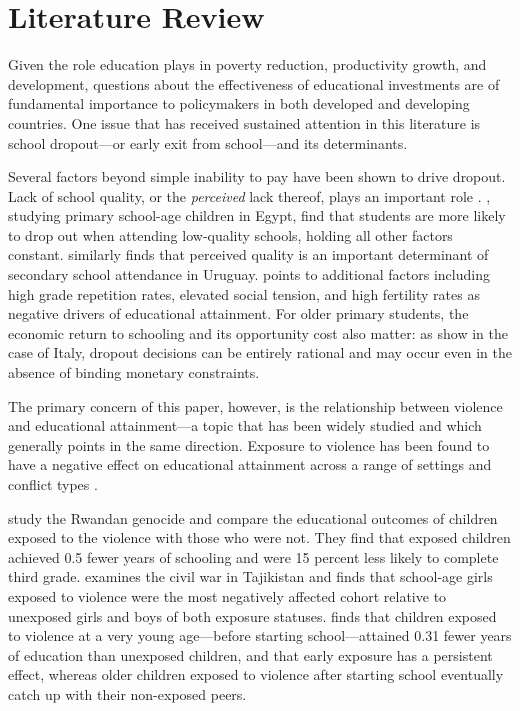 
\section{Literature Review}
\label{sec:literature}

Given the role education plays in poverty reduction, productivity growth,
and development, questions about the effectiveness of educational investments
are of fundamental importance to policymakers in both developed and
developing countries. One issue that has received sustained attention in this
literature is school dropout---or early exit from school---and its
determinants.

Several factors beyond simple inability to pay have been shown to drive
dropout. Lack of school quality, or the \emph{perceived} lack thereof,
plays an important role \citep{levy1971, hanushek2008, patron2008}.
\citet{hanushek2008}, studying primary school-age children in Egypt, find
that students are more likely to drop out when attending low-quality schools,
holding all other factors constant. \citet{patron2008} similarly finds that
perceived quality is an important determinant of secondary school attendance
in Uruguay. \citet{levy1971} points to additional factors including high
grade repetition rates, elevated social tension, and high fertility rates
as negative drivers of educational attainment. For older primary students,
the economic return to schooling and its opportunity cost also matter: as
\citet{ohiggins2008} show in the case of Italy, dropout decisions can be
entirely rational and may occur even in the absence of binding monetary
constraints.

The primary concern of this paper, however, is the relationship between
violence and educational attainment---a topic that has been widely studied
and which generally points in the same direction. Exposure to violence has
been found to have a negative effect on educational attainment across a
range of settings and conflict types \citep{akresh2008, swee2009,
rodriguez2009, shemyakina2011, leon2012}.

\citet{akresh2008} study the Rwandan genocide and compare the educational
outcomes of children exposed to the violence with those who were not.
They find that exposed children achieved 0.5 fewer years of schooling and
were 15 percent less likely to complete third grade. \citet{shemyakina2011}
examines the civil war in Tajikistan and finds that school-age girls
exposed to violence were the most negatively affected cohort relative to
unexposed girls and boys of both exposure statuses. \citet{leon2012}
finds that children exposed to violence at a very young age---before
starting school---attained 0.31 fewer years of education than unexposed
children, and that early exposure has a persistent effect, whereas older
children exposed to violence after starting school eventually catch up
with their non-exposed peers.

